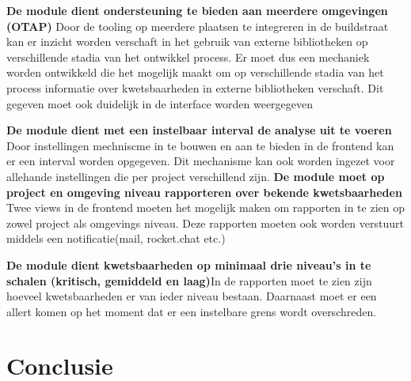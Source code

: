 \textbf{De module dient ondersteuning te bieden aan meerdere omgevingen (OTAP)}
Door de tooling op meerdere plaatsen te integreren in de buildstraat kan er inzicht worden verschaft in het gebruik van externe bibliotheken op verschillende stadia van het ontwikkel process. Er moet dus een mechaniek worden ontwikkeld die het mogelijk maakt om op verschillende stadia van het process informatie over kwetsbaarheden in externe bibliotheken verschaft. Dit gegeven moet ook duidelijk in de interface worden weergegeven


\textbf{De module dient met een instelbaar interval de analyse uit te voeren} Door instellingen mechniscme in te bouwen en aan te bieden in de frontend kan er een interval worden opgegeven. Dit mechanisme kan ook worden ingezet voor allehande instellingen die per project verschillend zijn.
\textbf{De module moet op project en omgeving niveau rapporteren over bekende kwetsbaarheden} Twee views in de frontend moeten het mogelijk maken om rapporten in te zien op zowel project als omgevings niveau. Deze rapporten moeten ook worden verstuurt middels een notificatie(mail, rocket.chat etc.)

\textbf{De module dient kwetsbaarheden op minimaal drie niveau’s in te schalen (kritisch, gemiddeld en laag)}In de rapporten moet te zien zijn hoeveel kwetsbaarheden er van ieder niveau bestaan. Daarnaast moet er een allert komen op het moment dat er een instelbare grens wordt overschreden.

\section{Conclusie}\label{sec:conclusie}
